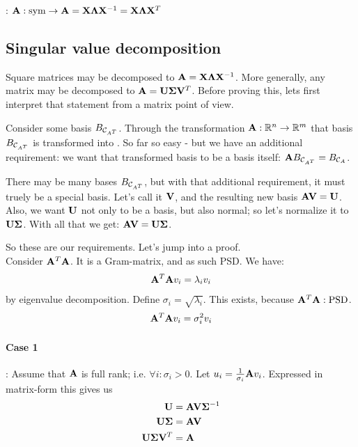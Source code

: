 \begin{theorem}
    : $\mathbf{A}: \text{sym} \to \mathbf{A} = \mathbf{X} \mathbf{\Lambda} \mathbf{X}^{-1} = \mathbf{X} \mathbf{\Lambda} \mathbf{X}^T$
\end{theorem}



\subsection{Singular value decomposition}
Square matrices may be decomposed to $\mathbf{A} = \mathbf{X} \mathbf{\Lambda} \mathbf{X}^{-1}$.
More generally, any matrix may be decomposed to $\mathbf{A} = \mathbf{U} \mathbf{\Sigma} \mathbf{V}^T$.
Before proving this, lets first interpret that statement from a matrix point of view.

Consider some basis $B_{\mathcal{C}_{A^T}}$. Through the transformation $\mathbf{A}: \mathbb{R}^n \to \mathbb{R}^m$ that basis $B_{\mathcal{C}_{A^T}}$ is transformed into .
So far so easy - but we have an additional requirement: we want that transformed basis to be a basis itself: $ \mathbf{A} B_{\mathcal{C}_{A^T}} = B_{\mathcal{C}_{A}}$.

There may be many bases $B_{\mathcal{C}_{A^T}}$, but with that additional requirement, it must truely be a special basis. Let's call it $\mathbf{V}$, and the resulting new basis $\mathbf{A} \mathbf{V} = \mathbf{U}$.
Also, we want $\mathbf{U}$ not only to be a basis, but also normal; so let's normalize it to $\mathbf{U}\mathbf{\Sigma}$. With all that we get: $\mathbf{A} \mathbf{V} = \mathbf{U} \mathbf{\Sigma}$.

So these are our requirements. Let's jump into a proof. \\


Consider $\mathbf{A}^T \mathbf{A}$. It is a Gram-matrix, and as such PSD. We have: 
$$ \mathbf{A}^T \mathbf{A} v_i = \lambda_i v_i $$
by eigenvalue decomposition. Define $\sigma_i = \sqrt{\lambda_i}$. This exists, because $\mathbf{A}^T \mathbf{A}: \text{PSD}$.
$$ \mathbf{A}^T \mathbf{A} v_i = \sigma_i^2 v_i $$

\paragraph{Case 1}: Assume that $\mathbf{A}$ is full rank; i.e. $\forall i: \sigma_i > 0$.
Let $u_i = \frac{1}{\sigma_i} \mathbf{A} v_i$. 
Expressed in matrix-form this gives us
\begin{equation}
    \begin{aligned}
        \mathbf{U}                            &= \mathbf{A} \mathbf{V} \mathbf{\Sigma}^{-1} \\
        \mathbf{U} \mathbf{\Sigma}              &= \mathbf{A} \mathbf{V} \\
        \mathbf{U} \mathbf{\Sigma} \mathbf{V}^T   &= \mathbf{A}
    \end{aligned}
\end{equation}

